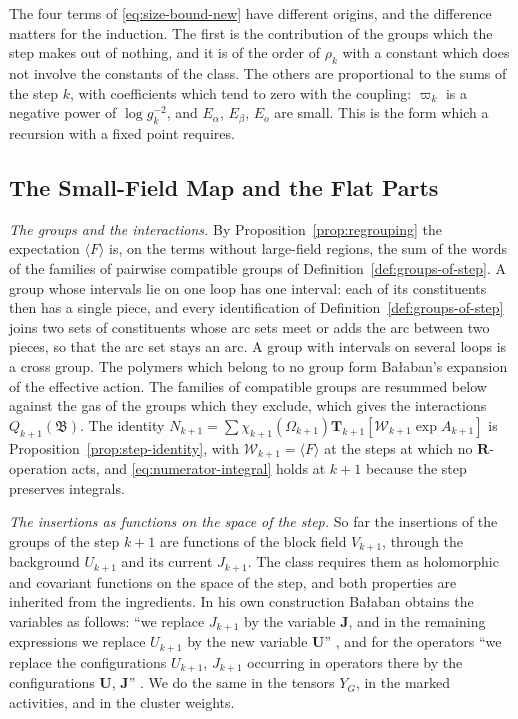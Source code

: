 \documentclass[11pt]{preprint}
\numberwithin{equation}{section}
\theoremstyle{definition}
\theoremstyle{remark}
\theoremstyle{plain}
\begin{document}
The four terms of \eqref{eq:size-bound-new} have different origins, and the difference matters for the induction. The first is the contribution of the groups which the step makes out of nothing, and it is of the order of $\rho_k$ with a constant which does not involve the constants of the class. The others are proportional to the sums of the step $k$, with coefficients which tend to zero with the coupling: $\varpi_k$ is a negative power of $\log g_k^{-2}$, and $E_\alpha$, $E_\beta$, $E_o$ are small. This is the form which a recursion with a fixed point requires.

\subsection{The Small-Field Map and the Flat Parts}\label{sec:small-field-map}

\emph{The groups and the interactions.} By Proposition~\ref{prop:regrouping} the expectation $\langle F\rangle$ is, on the terms without large-field regions, the sum of the words of the families of pairwise compatible groups of Definition~\ref{def:groups-of-step}. A group whose intervals lie on one loop has one interval: each of its constituents then has a single piece, and every identification of Definition~\ref{def:groups-of-step} joins two sets of constituents whose arc sets meet or adds the arc between two pieces, so that the arc set stays an arc. A group with intervals on several loops is a cross group. The polymers which belong to no group form Ba{\l}aban's expansion of the effective action. The families of compatible groups are resummed below against the gas of the groups which they exclude, which gives the interactions $Q_{k+1}(\mathfrak B)$. The identity $N_{k+1} = \sum\chi_{k+1}(\Omega_{k+1})\mathbf T_{k+1}[\mathcal W_{k+1}\exp A_{k+1}]$ is Proposition~\ref{prop:step-identity}, with $\mathcal W_{k+1} = \langle F\rangle$ at the steps at which no $\mathbf R$-operation acts, and \eqref{eq:numerator-integral} holds at $k + 1$ because the step preserves integrals.

\emph{The insertions as functions on the space of the step.} So far the insertions of the groups of the step $k + 1$ are functions of the block field $V_{k+1}$, through the background $U_{k+1}$ and its current $J_{k+1}$. The class requires them as holomorphic and covariant functions on the space of the step, and both properties are inherited from the ingredients. In his own construction Ba{\l}aban obtains the variables as follows: ``we replace $J_{k+1}$ by the variable $\mathbf J$, and in the remaining expressions we replace $U_{k+1}$ by the new variable $\mathbf U$'' \cite[p.~272]{BalabanRG1}, and for the operators ``we replace the configurations $U_{k+1}$, $J_{k+1}$ occurring in operators there by the configurations $\mathbf U$, $\mathbf J$'' \cite[p.~273]{BalabanRG1}. We do the same in the tensors $Y_G$, in the marked activities, and in the cluster weights.
\end{document}
